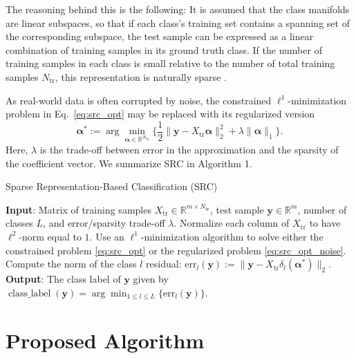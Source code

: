 \documentclass[review]{elsarticle}
\newcommand{\classlabel}{\operatorname{class\_label}}
\begin{document}
The reasoning behind this is the following: It is assumed that the class manifolds are linear subspaces, so that if each class's training set contains a spanning set of the corresponding subspace, the test sample can be expressed as a linear combination of training samples in its ground truth class. If the number of training samples in each class is small relative to the number of total training samples $N_\mathrm{tr}$, this representation is naturally sparse \cite{wri:src}. 

As real-world data is often corrupted by noise, the constrained $\ell^1$-minimization problem in Eq.~\eqref{eq:src_opt} may be replaced with its regularized version
\begin{equation} \label{eq:src_opt_noise}
\bm{\alpha}^* := \arg \min_{\bm{\alpha}\in \mathbb{R}^{N_\mathrm{tr}}} \Big \{\frac{1}{2} \|\bm{y}-X_\mathrm{tr}\bm{\alpha}\|_2^2 + \lambda\|\bm{\alpha}\|_1\Big \}.
\end{equation}
Here, $\lambda$ is the trade-off between error in the approximation and the sparsity of the coefficient vector. We summarize SRC in Algorithm 1.

\begin{algorithm}
\caption{Sparse Representation-Based Classification (SRC) \cite{wri:src}}
\label{alg:src}
\begin{algorithmic}[1]
\STATE \textbf{Input}: Matrix of training samples $X_\mathrm{tr} \in \mathbb{R}^{m\times N_{\mathrm{tr}}}$, test sample $\bm{y} \in \mathbb{R}^m$, number of classes $L$, and error/sparsity trade-off $\lambda$.
\STATE Normalize each column of $X_\mathrm{tr}$ to have $\ell^2$-norm equal to $1$.
\STATE Use an $\ell^1$-minimization algorithm to solve either the constrained problem \eqref{eq:src_opt} or the regularized problem \eqref{eq:src_opt_noise}.
\STATE Compute the norm of the class $l$ residual:
$\mathrm{err}_l(\bm{y}) := \big\|\bm{y} - X_\mathrm{tr}\delta_l(\bm{\alpha}^*)\big\|_2$.
\ENDFOR
\STATE \textbf{Output}: The class label of $\bm{y}$ given by
$\classlabel(\bm{y}) = \arg \min_{1\leq l \leq L} \{\mathrm{err}_l(\bm{y})\}$.
\end{algorithmic}
\end{algorithm}





\section{Proposed Algorithm}\label{sec:alg}
\end{document}
